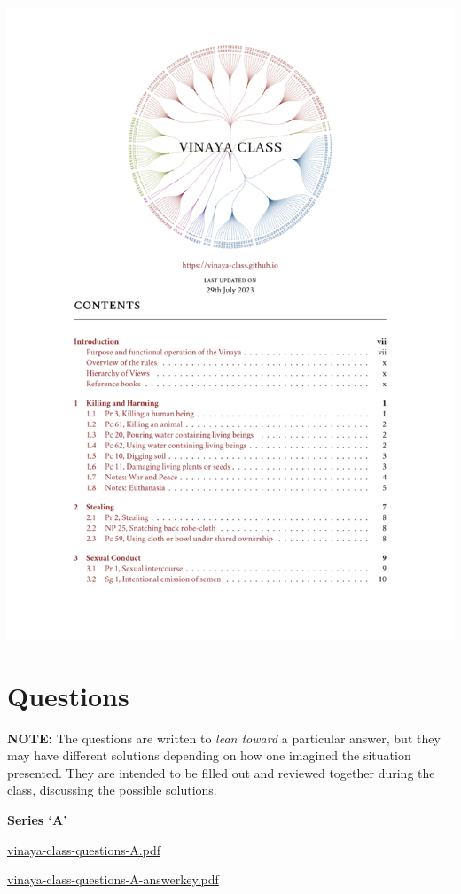 \href{./includes/docs/vinaya-class-notes.pdf}{\includegraphics{./includes/docs/vinaya-class-notes-thumb.png}}

\section{Questions}

\textbf{NOTE:} The questions are written to \emph{lean toward} a
particular answer, but they may have different solutions depending on
how one imagined the situation presented. They are intended to be filled
out and reviewed together during the class, discussing the possible
solutions.

\textbf{Series `A'}

\href{./includes/docs/vinaya-class-questions-A.pdf}{vinaya-class-questions-A.pdf}

\href{./includes/docs/vinaya-class-questions-A-answerkey.pdf}{vinaya-class-questions-A-answerkey.pdf}

